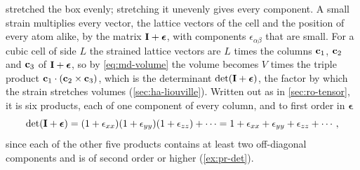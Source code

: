  stretched the box evenly; stretching it unevenly
gives every component. A small strain multiplies every vector, the
lattice vectors of the cell and the position of every atom alike, by the
matrix $\bm{\mathrm{I}} + \boldsymbol{\epsilon}$, with components
$\epsilon_{\alpha\beta}$ that are small. For a cubic cell of side $L$ the
strained lattice vectors are $L$ times the columns $\bm{\mathrm{c}}_1$, $\bm{\mathrm{c}}_2$
and $\bm{\mathrm{c}}_3$ of $\bm{\mathrm{I}} + \boldsymbol{\epsilon}$, so by
\cref{eq:md-volume} the volume becomes $V$ times the triple product
$\bm{\mathrm{c}}_1\cdot(\bm{\mathrm{c}}_2\times\bm{\mathrm{c}}_3)$, which is the determinant
$\det(\bm{\mathrm{I}} + \boldsymbol{\epsilon})$, the factor by which the strain
stretches volumes (\cref{sec:ha-liouville}). Written out as in
\cref{sec:ro-tensor}, it is six products, each of one component of every
column, and to first order in $\boldsymbol{\epsilon}$
\begin{equation*}
   \det(\bm{\mathrm{I}} + \boldsymbol{\epsilon}) = (1 + \epsilon_{xx})(1 +
   \epsilon_{yy})(1 + \epsilon_{zz}) + \dotsb = 1 + \epsilon_{xx} +
   \epsilon_{yy} + \epsilon_{zz} + \dotsb ,
\end{equation*}
since each of the other five products contains at least two off-diagonal
components and is of second order or higher (\cref{ex:pr-det}).

